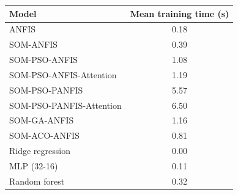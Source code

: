 \begin{tabular}{lc}
\hline
Model & Mean training time (s) \\
\hline
ANFIS & 0.18 \\
SOM-ANFIS & 0.39 \\
SOM-PSO-ANFIS & 1.08 \\
SOM-PSO-ANFIS-Attention & 1.19 \\
SOM-PSO-PANFIS & 5.57 \\
SOM-PSO-PANFIS-Attention & 6.50 \\
SOM-GA-ANFIS & 1.16 \\
SOM-ACO-ANFIS & 0.81 \\
Ridge regression & 0.00 \\
MLP (32-16) & 0.11 \\
Random forest & 0.32 \\
\hline
\end{tabular}
